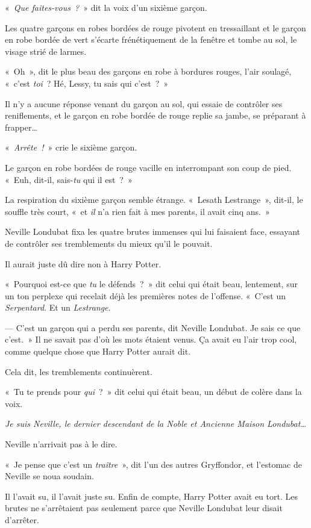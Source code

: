 «~\emph{Que faites-vous~?}~» dit la voix d'un sixième garçon.

Les quatre garçons en robes bordées de rouge pivotent en tressaillant et le garçon en robe bordée de vert s'écarte frénétiquement de la fenêtre et tombe au sol, le visage strié de larmes.

«~Oh~», dit le plus beau des garçons en robe à bordures rouges, l'air soulagé, «~c'est \emph{toi}~? Hé, Lessy, tu sais qui c'est~?~»

Il n'y a aucune réponse venant du garçon au sol, qui essaie de contrôler ses reniflements, et le garçon en robe bordée de rouge replie sa jambe, se préparant à frapper…

«~\emph{Arrête~!}~» crie le sixième garçon.

Le garçon en robe bordées de rouge vacille en interrompant son coup de pied. «~Euh, dit-il, sais-\emph{tu} qui il est~?~»

La respiration du sixième garçon semble étrange. «~Lesath Lestrange~», dit-il, le souffle très court, «~et \emph{il} n'a rien fait à mes parents, il avait cinq ans.~»

\later

Neville Londubat fixa les quatre brutes immenses qui lui faisaient face, essayant de contrôler ses tremblements du mieux qu'il le pouvait.

Il aurait juste dû dire non à Harry Potter.

«~Pourquoi est-ce que \emph{tu} le défends~?~» dit celui qui était beau, lentement, sur un ton perplexe qui recelait déjà les premières notes de l'offense. «~C'est un \emph{Serpentard}. Et un \emph{Lestrange}.

--- C'est un garçon qui a perdu ses parents, dit Neville Londubat. Je sais ce que c'est.~» Il ne savait pas d'où les mots étaient venus. Ça avait eu l'air trop cool, comme quelque chose que Harry Potter aurait dit.

Cela dit, les tremblements continuèrent.

«~Tu te prends pour \emph{qui}~?~» dit celui qui était beau, un début de colère dans la voix.

\emph{Je suis Neville, le dernier descendant de la Noble et Ancienne Maison Londubat…}

Neville n'arrivait pas à le dire.

«~Je pense que c'est un \emph{traître}~», dit l'un des autres Gryffondor, et l'estomac de Neville se noua soudain.

Il l'avait su, il l'avait juste su. Enfin de compte, Harry Potter avait eu tort. Les brutes ne s'arrêtaient pas seulement parce que Neville Londubat leur disait d'arrêter.

